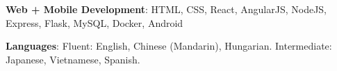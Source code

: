 






\textbf{Web + Mobile Development}: HTML, CSS, React, AngularJS, NodeJS, Express, Flask, MySQL, Docker, Android %


\textbf{Languages}: Fluent: English, Chinese (Mandarin), Hungarian. Intermediate: Japanese, Vietnamese, Spanish. %

